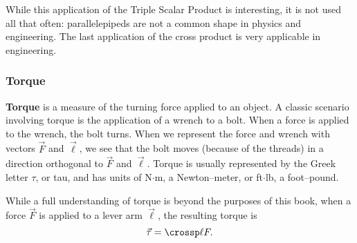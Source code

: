 While this application of the Triple Scalar Product is interesting, it is not used all that often: parallelepipeds are not a common shape in physics and engineering.
The last application of the cross product is very applicable in engineering.

\subsubsection*{Torque}

\textbf{Torque} is a measure of the turning force applied to an object. A classic scenario involving torque is the application of a wrench to a bolt. When a force is applied to the wrench, the bolt turns. When we represent the force and wrench with vectors $\vec F$ and $\vec \ell$, we see that the bolt moves (because of the threads) in a  direction orthogonal to $\vec F$ and $\vec \ell$. Torque is usually represented by the Greek letter $\tau$, or tau, and has units of N$\cdot$m, a Newton--meter, or ft$\cdot$lb, a foot--pound.

While a full understanding of torque is beyond the purposes of this book, when a force $\vec F$ is applied to a lever arm $\vec \ell$, the resulting torque is \begin{equation}\vec \tau = \crossp \ell F.\label{eq:crossp3}\end{equation}

